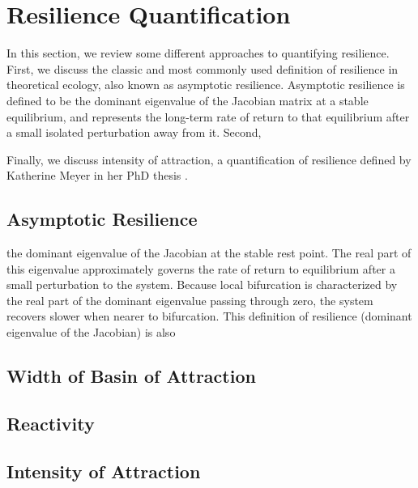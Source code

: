 \section{Resilience Quantification}
\label{sec:resilience}

In this section, we review some different approaches to quantifying resilience. 
%
First, we discuss the classic and most commonly used definition of resilience in theoretical ecology, also known as asymptotic resilience. Asymptotic resilience is defined to be the dominant eigenvalue of the Jacobian matrix at a stable equilibrium, and represents the long-term rate of return to that equilibrium after a small isolated perturbation away from it. 
%
Second, 


%
Finally, we discuss intensity of attraction, a quantification of resilience defined by Katherine Meyer in her PhD thesis \cite{meyerMetricPropertiesAttractors2019}. 


\subsection{Asymptotic Resilience}

 the dominant eigenvalue of the Jacobian at the stable rest point. The real part of this eigenvalue approximately governs the rate of return to equilibrium after a small perturbation to the system. Because local bifurcation is characterized by the real part of the dominant eigenvalue passing through zero, the system recovers slower when nearer to bifurcation. This definition of resilience (dominant eigenvalue of the Jacobian) is also

\subsection{Width of Basin of Attraction}

\subsection{Reactivity}

\subsection{Intensity of Attraction}
